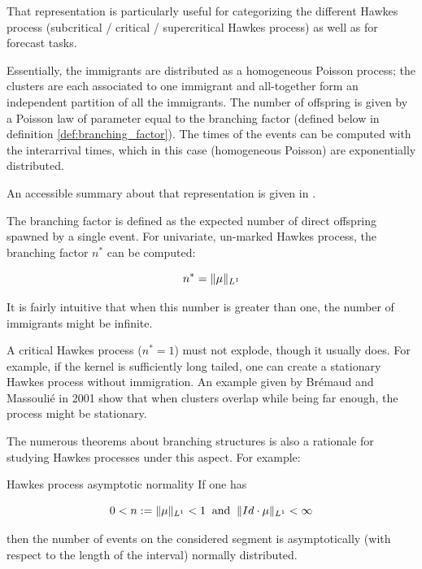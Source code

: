 That representation is particularly useful for categorizing the different Hawkes process (subcritical / critical / supercritical Hawkes process) as well as for forecast tasks.

Essentially, the immigrants are distributed as a homogeneous Poisson process; the clusters are each associated to one immigrant and all-together form an independent partition of all the immigrants. The number of offspring is given by a Poisson law of parameter equal to the branching factor (defined below in definition \ref{def:branching_factor}). The times of the events can be computed with the interarrival times, which in this case (homogeneous Poisson) are exponentially distributed.

An accessible summary about that representation is given in \cite{socialhawkes}. 

\begin{definition}
\label{def:branching_factor}
The branching factor is defined as the expected number of direct offspring spawned by a single event. For univariate, un-marked Hawkes process, the branching factor $n^*$ can be computed:

$$ n^* = \lVert  \mu \rVert_{L^1} $$

It is fairly intuitive that when this number is greater than one, the number of immigrants might be infinite. 
\end{definition}


\begin{remarque}
A critical Hawkes process ($n^* = 1$) must not explode, though it usually does. For example, if the kernel is sufficiently long tailed, one can create a stationary Hawkes process without immigration. An example given by Brémaud and Massoulié in 2001 show that when clusters overlap while being far enough, the process might be stationary.
\end{remarque}


The numerous theorems about branching structures is also a rationale for studying Hawkes processes under this aspect. For example:

\begin{theoreme}{Hawkes process asymptotic normality}
If one has

$$ 0 < n := \lVert  \mu \rVert_{L^1} < 1 \: \text{ and }  \: \lVert  Id \cdot \mu \rVert_{L^1} < \infty $$

then the number of events on the considered segment is asymptotically (with respect to the length of the interval) normally distributed.

\end{theoreme}




